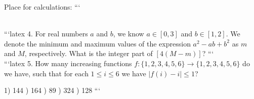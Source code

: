 Place for calculations:
```

\\
```latex
4. For real numbers \( a \) and \( b \), we know \( a \in [0,3] \) and \( b \in [1,2] \). We denote the minimum and maximum values of the expression \( a^2 - ab + b^2 \) as \( m \) and \( M \), respectively. What is the integer part of \( [4(M-m)] \)?
```
\\
```latex
5. How many increasing functions $f: \{1,2,3,4,5,6\} \to \{1,2,3,4,5,6\}$ do we have, such that for each $1 \leq i \leq 6$ we have $|f(i) - i| \leq 1$?

1) 144 ) 164 ) 89 ) 324 ) 128
```
\\
